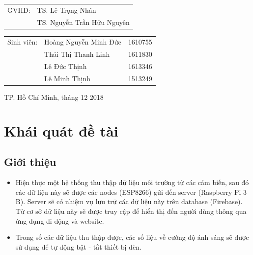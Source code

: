 \documentclass[12pt,titlepage,a4paper]{article}
\begin{document}
\begin{titlepage}
\begin{table}[h]
\begin{tabular}{ll}
\hspace{2.75cm} GVHD: & TS. Lê Trọng Nhân \\
& TS. Nguyễn Trần Hữu Nguyên \\
\end{tabular}
\end{table}
\begin{table}[h]
\begin{tabular}{lll}
\hspace{2.75cm} Sinh viên: & Hoàng Nguyễn Minh Đức & 1610755\\
& Thái Thị Thanh Linh & 1611830 \\
& Lê Đức Thịnh & 1613346 \\
& Lê Minh Thịnh & 1513249
\end{tabular}
\end{table}

\vspace{3.2cm}
\begin{center}
{\footnotesize TP. Hồ Chí Minh, tháng 12 2018}
\end{center}
\end{titlepage}

\newpage
\thispagestyle{empty}
\tableofcontents




\newpage
\section{Khái quát đề tài}
\subsection{Giới thiệu}
\begin{itemize}
\item Hiện thực một hệ thống thu thập dữ liệu môi trường từ các cảm biến, sau đó các dữ liệu này sẽ được các nodes (ESP8266) gửi đến server (Raspberry Pi 3 B). Server sẽ có nhiệm vụ lưu trữ các dữ liệu này trên database (Firebase). Từ cơ sở dữ liệu này sẽ được truy cập để hiển thị đến người dùng thông qua ứng dụng di động và website.
\item Trong số các dữ liệu thu thập được, các số liệu về cường độ ánh sáng sẽ được sử dụng để tự động bật - tắt thiết bị đèn.
\end{itemize}
\end{document}
